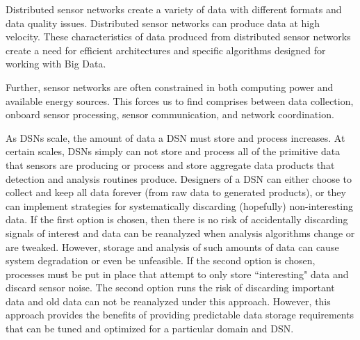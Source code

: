 Distributed sensor networks create a variety of data with different formats and data quality issues. Distributed sensor networks can produce data at high velocity. These characteristics of data produced from distributed sensor networks create a need for efficient architectures and specific algorithms designed for working with Big Data.

Further, sensor networks are often constrained in both computing power and available energy sources. This forces us to find comprises between data collection, onboard sensor processing, sensor communication, and network coordination.

As DSNs scale, the amount of data a DSN must store and process increases. At certain scales, DSNs simply can not store and process all of the primitive data that sensors are producing or process and store aggregate data products that detection and analysis routines produce. Designers of a DSN can either choose to collect and keep all data forever (from raw data to generated products), or they can implement strategies for systematically discarding (hopefully) non-interesting data. If the first option is chosen, then there is no risk of accidentally discarding signals of interest and data can be reanalyzed when analysis algorithms change or are tweaked. However, storage and analysis of such amounts of data can cause system degradation or even be unfeasible. If the second option is chosen, processes must be put in place that attempt to only store ``interesting" data and discard sensor noise.  The second option runs the risk of discarding important data and old data can not be reanalyzed under this approach. However, this approach provides the benefits of providing predictable data storage requirements that can be tuned and optimized for a particular domain and DSN.

